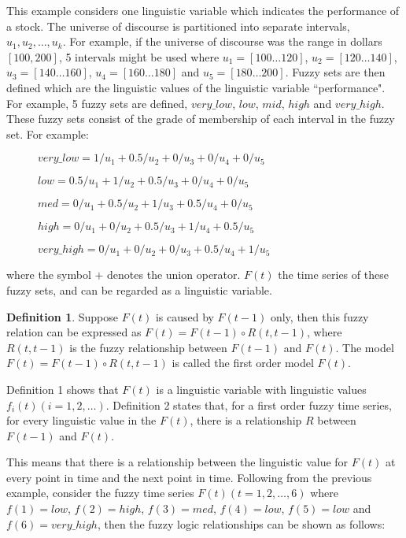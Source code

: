 \documentclass{article}
\theoremstyle{definition}
\newtheorem{ftsdef}{Definition}
\begin{document}
This example considers one linguistic variable which indicates the performance of a stock. The universe of discourse is partitioned into separate intervals, $u_1, u_2,\ldots,u_k$. For example, if the universe of discourse was the range in dollars $[100, 200]$, 5 intervals might be used where $u_1 = [100 \ldots 120]$, $u_2 = [120 \ldots 140]$, $u_3 = [140 \ldots 160]$, $u_4 = [160 \ldots 180]$ and $u_5 = [180 \ldots 200]$. Fuzzy sets are then defined which are the linguistic values of the linguistic variable ``performance". For example, 5 fuzzy sets are defined, $very\_low$, $low$, $mid$, $high$ and $very\_high$. These fuzzy sets consist of the grade of membership of each interval in the fuzzy set. For example:
\begin{description}
\item[] $very\_low = 1/u_1 + 0.5/u_2 + 0/u_3 + 0/u_4 + 0/u_5$
\item[] $low = 0.5/u_1 + 1/u_2 + 0.5/u_3 + 0/u_4 + 0/u_5$
\item[] $med = 0/u_1 + 0.5/u_2 + 1/u_3 + 0.5/u_4 + 0/u_5$
\item[] $high = 0/u_1 + 0/u_2 + 0.5/u_3 + 1/u_4 + 0.5/u_5$
\item[] $very\_high = 0/u_1 + 0/u_2 + 0/u_3 + 0.5/u_4 + 1/u_5$
\end{description}
where the symbol $+$ denotes the union operator. $F(t)$ the time series of these fuzzy sets, and can be regarded as a linguistic variable.

\begin{ftsdef}
Suppose $F(t)$ is caused by $F(t-1)$ only, then this fuzzy relation can be expressed as $F(t)=F(t-1) \circ R(t,t-1)$, where $R(t,t-1)$ is the fuzzy relationship between $F(t-1)$ and $F(t)$. The model $F(t)=F(t-1) \circ R(t,t-1)$ is called the first order model $F(t)$.
\end{ftsdef}

Definition 1 shows that $F(t)$ is a linguistic variable with linguistic values $f_i(t) (i=1,2,\ldots)$. Definition 2 states that, for a first order fuzzy time series, for every linguistic value in the $F(t)$, there is a relationship $R$ between $F(t-1)$ and $F(t)$. 

This means that there is a relationship between the linguistic value for $F(t)$ at every point in time and the next point in time. Following from the previous example, consider the fuzzy time series $F(t)(t=1,2,\ldots,6)$ where $f(1)=low$, $f(2)=high$, $f(3)=med$, $f(4)=low$, $f(5)=low$ and $f(6)=very\_high$, then the fuzzy logic relationships can be shown as follows: 
\end{document}
